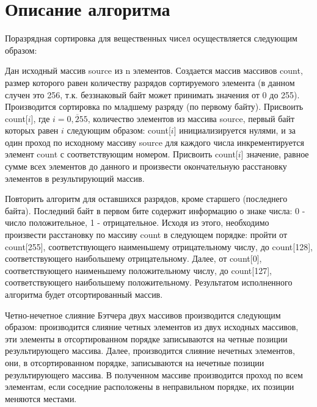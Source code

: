 \documentclass{report}
\begin{document}
\section*{Описание алгоритма}
\par Поразрядная сортировка для вещественных чисел осуществляется следующим образом:
\par Дан исходный массив source из n элементов. Создается массив массивов count, размер которого равен количеству разрядов сортируемого элемента (в данном случен это 256, т.к. беззнаковый байт может принимать значения от 0 до 255). Производится сортировка по младшему разряду (по первому байту). Присвоить count[$i$], где $i = \overline{0, 255}$, количество элементов из массива source, первый байт которых равен $i$ следующим образом: count[$i$] инициализируется нулями, и за один проход по исходному массиву source для каждого числа инкрементируется элемент count с соответствующим номером. Присвоить count[$i$] значение, равное сумме всех элементов до данного и произвести окончательную расстановку элементов в результирующий массив.
\par Повторить алгоритм для оставшихся разрядов, кроме старшего (последнего байта). Последний байт в первом бите содержит информацию о знаке числа: 0 - число положительное, 1 - отрицательное. Исходя из этого, необходимо произвести расстановку по массиву count в следующем порядке: пройти от count[255], соответствующего наименьшему отрицательному числу, до count[128], соответствующего наибольшему отрицательному. Далее, от count[0], соответствующего наименьшему положительному числу, до count[127], соответствующего наибольшему положительному. Результатом исполненного алгоритма будет отсортированный массив.
\par Четно-нечетное слияние Бэтчера двух массивов производится следующим образом: производится слияние четных элементов из двух исходных массивов, эти элементы в отсортированном порядке записываются на четные позиции результирующего массива. Далее, производится слияние нечетных элементов, они, в отсортированном порядке, записываются на нечетные позиции результирующего массива. В полученном массиве производится проход по всем элементам, если соседние расположены в неправильном порядке, их позиции меняются местами.
\newpage

\end{document}
